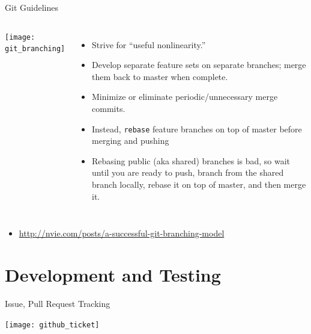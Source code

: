 \documentclass[mathserif]{beamer}
\begin{document}
\begin{frame}[fragile]{Git Guidelines}
  \begin{columns}
    \texttt{[image: git\_branching]}
    \begin{itemize}\itemsep=.05\textheight
    \item Strive for ``useful nonlinearity.''
    \item Develop separate feature sets on separate branches; merge them back to master when complete.
    \item Minimize or eliminate periodic/unnecessary merge commits.
    \item Instead, \texttt{rebase} feature branches on top of master before merging and pushing
    \item Rebasing public (aka shared) branches is bad\texttrademark, so wait until you are ready to push,
      branch from the shared branch locally, rebase it on top of master, and then merge it.
    \end{itemize}
  \end{columns}
    \small
    \begin{itemize}
    \item \url{http://nvie.com/posts/a-successful-git-branching-model}
    \end{itemize}
\end{frame}


\section{Development and Testing}


\begin{frame}{Issue, Pull Request Tracking}
  \begin{center}
    \texttt{[image: github\_ticket]}
  \end{center}
\end{frame}
\end{document}
